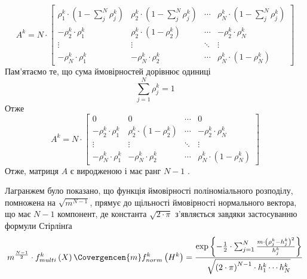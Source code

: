 \begin{equation*}
  A^k
  = N \cdot
   \begin{bmatrix}
     \rho_1^k \cdot \left( 1 - \sum_{j}^{N}\rho_j^k \right) &
     \rho_2^k \cdot \left( 1 - \sum_{j}^{N}\rho_j^k \right)
     & \cdots & \rho_N^k \cdot \left( 1 - \sum_{j}^{N}\rho_j^k \right) \\

      - \rho_2^k \cdot \rho_1^k                  & \rho_2^k \cdot
          \left( 1 - \rho_2^k \right) & \cdots & - \rho_2^k \cdot \rho_N^k \\

      \vdots                                     & \vdots
              & \ddots & \vdots \\

       - \rho_N^k \cdot \rho_1^k                 & - \rho_N^k \cdot \rho_2^k
              & \cdots & \rho_N^k \cdot \left( 1 - \rho_N^k \right)
    \end{bmatrix}
\end{equation*}
Пам’ятаємо те, що сума ймовірностей дорівнює одиниці
\begin{equation*}
  \sum_{j=1}^{N}\rho_j^k = 1
\end{equation*}
Отже
\begin{equation*}
  A^k
  = N \cdot
   \begin{bmatrix}
     0 & 0 & \cdots & 0 \\
      - \rho_2^k \cdot \rho_1^k                  & \rho_2^k \cdot
          \left( 1 - \rho_2^k \right) & \cdots & - \rho_2^k \cdot \rho_N^k \\

      \vdots                                     & \vdots
              & \ddots & \vdots \\

       - \rho_N^k \cdot \rho_1^k                 & - \rho_N^k \cdot \rho_2^k
              & \cdots & \rho_N^k \cdot \left( 1 - \rho_N^k \right)
    \end{bmatrix}
\end{equation*}
Отже, матриця $A$ є виродженою і має ранг $N-1$ \cite{Kendall:1966}.

Лагранжем було показано, що функція ймовірності поліноміального розподілу,
помножена на $\sqrt{m^{N-1}}$, прямує до щільності ймовірності нормального
вектора, що має $N-1$ компонент, де константа $\sqrt{2 \cdot \pi}$ з’являється
завдяки застосуванню формули Стірлінґа \cite{Lagrange:1868}
\begin{equation}\label{eq:probability:normal}
  m^{\frac{N-1}{2}} \cdot f_{multi}^k\left( X \right)
  \Covergencen{m} f_{norm}^k\left( H^k \right)
  = \frac{\exp{\left\{ -\frac{1}{2} \cdot \sum_{j=1}^{N}
        \frac{m \cdot \left( \rho_j^k - h_j^k \right)^2}{h_j^k} \right\}}}
      {\sqrt{\left( 2 \cdot \pi \right)^{N-1} \cdot h_1^k \cdots h_N^k}}
\end{equation}

